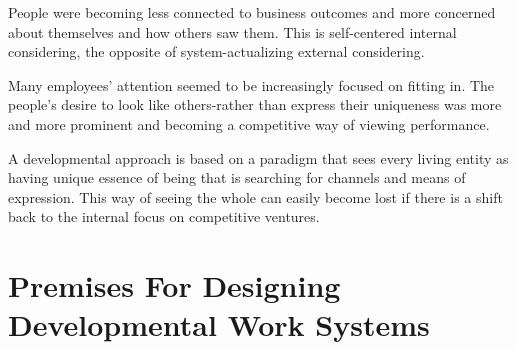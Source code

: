 \documentclass[ebook,12pt,oneside,openany]{memoir}
\begin{document}
People were becoming less connected to business outcomes and more concerned about themselves and how others saw them. This is self-centered internal considering, the opposite of system-actualizing external considering. 

Many employees' attention seemed to be increasingly focused on fitting in. The people's desire to look like others-rather than express their uniqueness was more and more prominent and becoming a competitive way of viewing performance.

A developmental approach is based on a paradigm that sees every living entity as having unique essence of being that is searching for channels and means of expression. This way of seeing the whole can easily become lost if there is a shift back to the internal focus on competitive ventures.

\section{Premises For Designing Developmental Work Systems}
\end{document}
